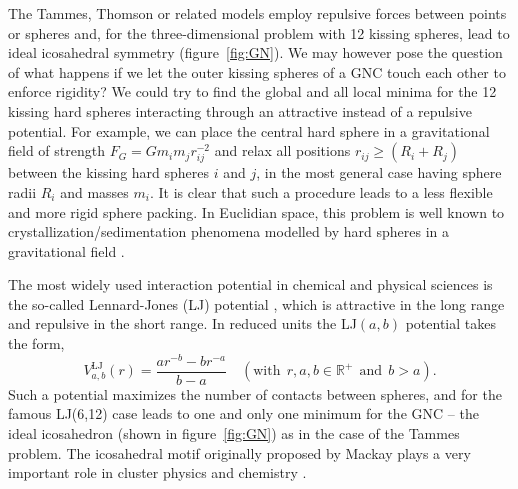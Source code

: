 The Tammes, Thomson  or related models employ repulsive forces between points
or spheres \autocite{Wales_Structuredynamicsspherical_2006,Wales_Defectmotifsspherical_2009} and, for the
three-dimensional problem with 12 kissing spheres, lead to ideal icosahedral
symmetry (figure~\ref{fig:GN}). We may however pose the question of what
happens if we let the outer kissing spheres of a \ac{GNC} touch each other to
enforce rigidity? We could try to find the global and all local minima for the
12 kissing hard spheres interacting through an attractive instead of a
repulsive potential. For example, we can place the central hard sphere in a
gravitational field of strength $F_G=Gm_im_jr_{ij}^{-2}$ and relax all
positions $r_{ij}\ge (R_i+R_j)$ between the kissing hard spheres $i$ and $j$,
in the most general case having sphere radii $R_i$ and masses $m_i$. It is
clear that such a procedure leads to a less flexible and more rigid sphere
packing. In Euclidian space, this problem is well known to
crystallization/sedimentation phenomena modelled by hard spheres in a
gravitational field \autocite{Levin_Crystallizationhardspheres_2000,Pusey_Hardspherescrystallization_2009}.

The most widely used interaction potential in chemical and physical sciences is
the so-called Lennard-Jones (LJ) potential
\autocite{Jones_DeterminationMolecularFields_1924,Lennard-Jones_Cohesion_1931},
which is attractive in the long range and repulsive in the short range. In
reduced units the LJ$(a,b)$ potential takes the form, 
%
\begin{equation}
    V_{a,b}^\mathrm{LJ}(r)=\frac{ar^{-b}-br^{-a}}{b-a} \quad (\mathrm{with} \ \ r,a,b \in \mathbb{R}^+ \ \ \mathrm{and} \ \ b>a).
\label{eqn:abpot}
\end{equation}
%
Such a potential maximizes the number of contacts between spheres, and for the
famous LJ(6,12) case leads to one and only one minimum for the \ac{GNC}
\autocite{Trombach_stickyhardsphereLennardJonestypeclusters_2018} -- the ideal icosahedron (shown in figure~\ref{fig:GN}) as
in the case of the Tammes problem. The icosahedral motif originally proposed by
Mackay \autocite{Mackay-1962} plays a very important role in cluster physics and
chemistry
\autocite{Hoare_Physicalclustermechanics_1975,Klots90,Uppenbrink-1991,vandewaal93,Wales_Whatcancalculations_1996,Wales_ChangesMorphologyCapping_1996,Wales_Structuredynamicsspherical_2006}.

